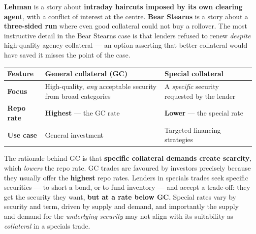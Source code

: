 \begin{lrtrapbox}
\textbf{Lehman} is a story about \textbf{intraday haircuts imposed by its own clearing agent}, with a conflict of interest at the centre. \textbf{Bear Stearns} is a story about a \textbf{three-sided run} where even good collateral could not buy a rollover. The most instructive detail in the Bear Stearns case is that lenders refused to renew \emph{despite} high-quality agency collateral --- an option asserting that better collateral would have saved it misses the point of the case.
\end{lrtrapbox}


\begin{center}
\small
\begin{tabularx}{\textwidth}{@{}p{2.6cm} X X@{}}
\toprule
\rowcolor{FRMSoft}\textbf{Feature} & \textbf{General collateral (GC)} & \textbf{Special collateral} \\
\midrule
\textbf{Focus} & High-quality, \emph{any} acceptable security from broad categories & A \emph{specific} security requested by the lender \\
\textbf{Repo rate} & \textbf{Highest} --- the GC rate & \textbf{Lower} --- the special rate \\
\textbf{Use case} & General investment & Targeted financing strategies \\
\bottomrule
\end{tabularx}
\end{center}

\begin{lrkeybox}
The rationale behind GC is that \textbf{specific collateral demands create scarcity}, which \emph{lowers} the repo rate. GC trades are favoured by investors precisely because they usually offer the \textbf{highest} repo rates. Lenders in specials trades seek specific securities --- to short a bond, or to fund inventory --- and accept a trade-off: they get the security they want, \textbf{but at a rate below GC}. Special rates vary by security and term, driven by supply and demand, and importantly the supply and demand for the \emph{underlying security} may not align with its suitability as \emph{collateral} in a specials trade.
\end{lrkeybox}


